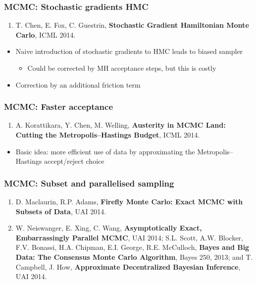 \documentclass{beamer}
\begin{document}
\begin{frame}
  \frametitle{MCMC: Stochastic gradients HMC}

  \begin{enumerate}
  \item T. Chen, E. Fox, C. Guestrin, \textbf{Stochastic Gradient Hamiltonian Monte Carlo}, ICML 2014.
  \end{enumerate}
  
  \begin{itemize}
  \item Naive introduction of stochastic gradients to HMC leads to
    biased sampler
    \begin{itemize}
    \item Could be corrected by MH acceptance steps, but this is costly
    \end{itemize}
  \item Correction by an additional friction term
  \end{itemize}
\end{frame}


\begin{frame}
  \frametitle{MCMC: Faster acceptance}

  \begin{enumerate}
  \item A. Korattikara, Y. Chen, M. Welling, \textbf{Austerity in MCMC Land: Cutting the Metropolis--Hastings Budget}, ICML 2014.
  \end{enumerate}

  \begin{itemize}
  \item Basic idea: more efficient use of data by approximating the
    Metropolis--Hastings accept/reject choice
  \end{itemize}
\end{frame}

\begin{frame}
  \frametitle{MCMC: Subset and parallelised sampling}

  \begin{enumerate}
  \item D. Maclaurin, R.P. Adams, \textbf{Firefly Monte Carlo: Exact MCMC with Subsets of Data}, UAI 2014.
  \item W. Neiswanger, E. Xing, C. Wang, \textbf{Asymptotically Exact, Embarrassingly Parallel MCMC}, UAI 2014; S.L. Scott, A.W. Blocker, F.V. Bonassi, H.A. Chipman, E.I. George, R.E. McCulloch, \textbf{Bayes and Big Data: The Consensus Monte Carlo Algorithm}, Bayes 250, 2013; and T. Campbell, J. How, \textbf{Approximate Decentralized Bayesian Inference}, UAI 2014. 
  \end{enumerate}
\end{frame}
\end{document}
